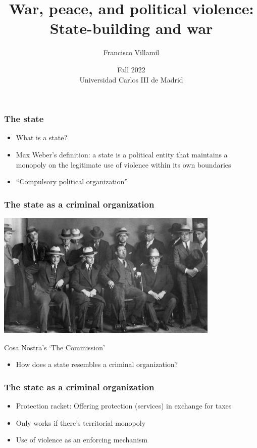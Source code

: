 \documentclass[utf8, xcolor=dvipsnames, handout]{beamer}
\title[War, peace, and political violence]{War, peace, and political violence:\\State-building and war}
\author[Francisco Villamil]{Francisco Villamil}
\date[UC3M / Fall 2022]{Fall 2022\\Universidad Carlos III de Madrid}
\begin{document}
\begin{frame}
  \titlepage
\end{frame}

\begin{frame}
\frametitle{The state}
\centering

\begin{itemize}[<+->]
\item What is a state?
\item Max Weber's definition: a state is a political entity that maintains a monopoly on the legitimate use of violence within its own boundaries
\item ``Compulsory political organization''
\end{itemize}

\end{frame}

\begin{frame}
\frametitle{The state as a criminal organization}
\centering

\includegraphics[width = 0.8\textwidth]{img/cosa_nostra}

{\small Cosa Nostra's `The Commission'}

\vspace{20pt}

\begin{itemize}
  \item How does a state resembles a criminal organization?
\end{itemize}

\end{frame}

\begin{frame}
\frametitle{The state as a criminal organization}
\centering

\begin{itemize}
  \item Protection racket: Offering protection (services) in exchange for taxes
  \item Only works if there's territorial monopoly
  \item Use of violence as an enforcing mechanism
\end{itemize}

\end{frame}
\end{document}
